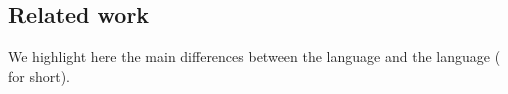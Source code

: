 \subsection{Related work}
\label{sec:related-work}



We highlight here the main differences between the {\UTP} language and the {\ITC} language ({\ITC} for short).

